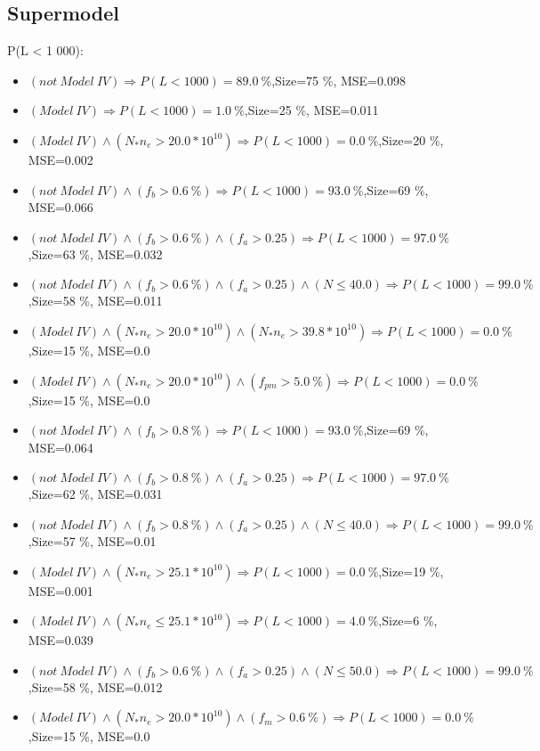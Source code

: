 \documentclass[numbered]{CSL}
\begin{document}
\subsection{Supermodel}
P(L < 1 000):
\begin{itemize}
\item $(not~Model~IV) \Rightarrow P(L < 1 000) = 89.0~\%$,\hfill Size=75 \%, MSE=0.098
\item $(Model~IV) \Rightarrow P(L < 1 000) = 1.0~\%$,\hfill Size=25 \%, MSE=0.011
\item $(Model~IV) \land (N_* n_e > 20.0 * 10^{10}) \Rightarrow P(L < 1 000) = 0.0~\%$,\hfill Size=20 \%, MSE=0.002
\item $(not~Model~IV) \land (f_b > 0.6~\%) \Rightarrow P(L < 1 000) = 93.0~\%$,\hfill Size=69 \%, MSE=0.066
\item $(not~Model~IV) \land (f_b > 0.6~\%) \land (f_a > 0.25) \Rightarrow P(L < 1 000) = 97.0~\%$,\hfill Size=63 \%, MSE=0.032
\item $(not~Model~IV) \land (f_b > 0.6~\%) \land (f_a > 0.25) \land (N \leq 40.0) \Rightarrow P(L < 1 000) = 99.0~\%$,\hfill Size=58 \%, MSE=0.011
\item $(Model~IV) \land (N_* n_e > 20.0 * 10^{10}) \land (N_* n_e > 39.8 * 10^{10}) \Rightarrow P(L < 1 000) = 0.0~\%$,\hfill Size=15 \%, MSE=0.0
\item $(Model~IV) \land (N_* n_e > 20.0 * 10^{10}) \land (f_{pm} > 5.0~\%) \Rightarrow P(L < 1 000) = 0.0~\%$,\hfill Size=15 \%, MSE=0.0
\item $(not~Model~IV) \land (f_b > 0.8~\%) \Rightarrow P(L < 1 000) = 93.0~\%$,\hfill Size=69 \%, MSE=0.064
\item $(not~Model~IV) \land (f_b > 0.8~\%) \land (f_a > 0.25) \Rightarrow P(L < 1 000) = 97.0~\%$,\hfill Size=62 \%, MSE=0.031
\item $(not~Model~IV) \land (f_b > 0.8~\%) \land (f_a > 0.25) \land (N \leq 40.0) \Rightarrow P(L < 1 000) = 99.0~\%$,\hfill Size=57 \%, MSE=0.01
\item $(Model~IV) \land (N_* n_e > 25.1 * 10^{10}) \Rightarrow P(L < 1 000) = 0.0~\%$,\hfill Size=19 \%, MSE=0.001
\item $(Model~IV) \land (N_* n_e \leq 25.1 * 10^{10}) \Rightarrow P(L < 1 000) = 4.0~\%$,\hfill Size=6 \%, MSE=0.039
\item $(not~Model~IV) \land (f_b > 0.6~\%) \land (f_a > 0.25) \land (N \leq 50.0) \Rightarrow P(L < 1 000) = 99.0~\%$,\hfill Size=58 \%, MSE=0.012
\item $(Model~IV) \land (N_* n_e > 20.0 * 10^{10}) \land (f_m > 0.6~\%) \Rightarrow P(L < 1 000) = 0.0~\%$,\hfill Size=15 \%, MSE=0.0

\end{itemize}
\end{document}
